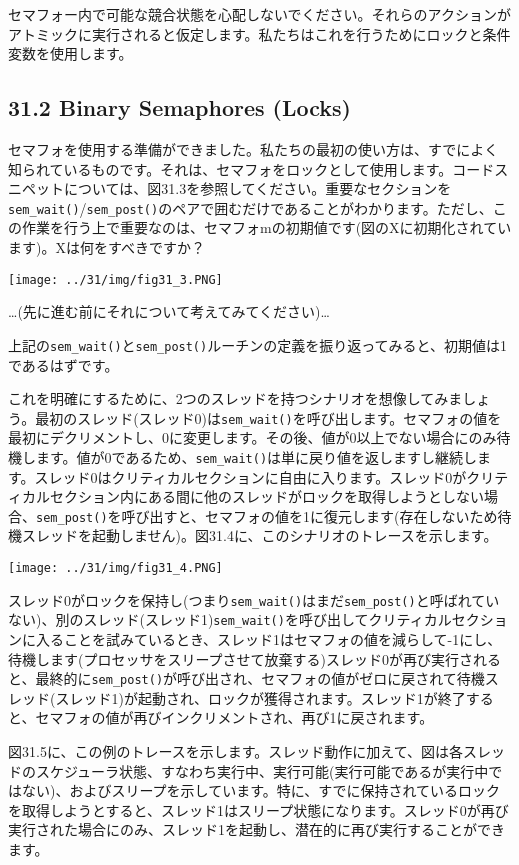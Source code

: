 セマフォー内で可能な競合状態を心配しないでください。それらのアクションがアトミックに実行されると仮定します。私たちはこれを行うためにロックと条件変数を使用します。

\hypertarget{binary-semaphores-locks}{%
\subsection*{31.2 Binary Semaphores
(Locks)}\label{binary-semaphores-locks}}

セマフォを使用する準備ができました。私たちの最初の使い方は、すでによく知られているものです。それは、セマフォをロックとして使用します。コードスニペットについては、図31.3を参照してください。重要なセクションを\texttt{sem\_wait()}/\texttt{sem\_post()}のペアで囲むだけであることがわかります。ただし、この作業を行う上で重要なのは、セマフォmの初期値です(図のXに初期化されています)。Xは何をすべきですか？

\texttt{[image: ../31/img/fig31\_3.PNG]}

\ldots(先に進む前にそれについて考えてみてください)\ldots{}

上記の\texttt{sem\_wait()}と\texttt{sem\_post()}ルーチンの定義を振り返ってみると、初期値は1であるはずです。

これを明確にするために、2つのスレッドを持つシナリオを想像してみましょう。最初のスレッド(スレッド0)は\texttt{sem\_wait()}を呼び出します。セマフォの値を最初にデクリメントし、0に変更します。その後、値が0以上でない場合にのみ待機します。値が0であるため、\texttt{sem\_wait()}は単に戻り値を返しますし継続します。スレッド0はクリティカルセクションに自由に入ります。スレッド0がクリティカルセクション内にある間に他のスレッドがロックを取得しようとしない場合、\texttt{sem\_post()}を呼び出すと、セマフォの値を1に復元します(存在しないため待機スレッドを起動しません)。図31.4に、このシナリオのトレースを示します。

\texttt{[image: ../31/img/fig31\_4.PNG]}

スレッド0がロックを保持し(つまり\texttt{sem\_wait()}はまだ\texttt{sem\_post()}と呼ばれていない)、別のスレッド(スレッド1)\texttt{sem\_wait()}を呼び出してクリティカルセクションに入ることを試みているとき、スレッド1はセマフォの値を減らして-1にし、待機します(プロセッサをスリープさせて放棄する)スレッド0が再び実行されると、最終的に\texttt{sem\_post()}が呼び出され、セマフォの値がゼロに戻されて待機スレッド(スレッド1)が起動され、ロックが獲得されます。スレッド1が終了すると、セマフォの値が再びインクリメントされ、再び1に戻されます。

図31.5に、この例のトレースを示します。スレッド動作に加えて、図は各スレッドのスケジューラ状態、すなわち実行中、実行可能(実行可能であるが実行中ではない)、およびスリープを示しています。特に、すでに保持されているロックを取得しようとすると、スレッド1はスリープ状態になります。スレッド0が再び実行された場合にのみ、スレッド1を起動し、潜在的に再び実行することができます。

